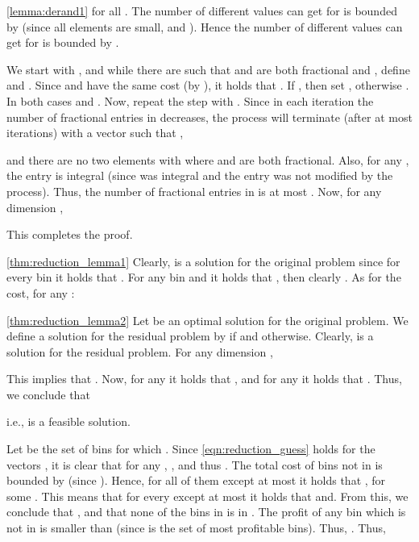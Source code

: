 \documentclass[11pt]{article}
\newenvironment{dl_proof}[1]{\noindent{\bf Proof of Lemma #1:}}{
 \hspace*{\fill}  \vskip \belowdisplayskip}
\begin{document}
{\begin{dl_proof}{\ref{lemma:derand1}}
for all .
The number of different values  can get for 
is bounded by  (since all elements are
small, and ). Hence the number of different
values  can get for  is bounded by
.

We start with , and while there are  such that  and  are both
fractional and , define 
and .
Since  and  have the same cost (by ), it holds that
.
If ,
then set , otherwise .
In both cases  and . Now, repeat
the step with .
Since in each iteration the number of fractional entries in  decreases,
 the process will terminate (after at most  iterations)
with a vector  such that ,

and there are no two elements  with  where
 and  are both fractional. Also, for any , the entry
 is integral (since  was integral and the entry was not modified by
the process). Thus, the number of fractional entries in  is
at most .
Now, for any dimension ,

This completes the proof.
\end{dl_proof}

\begin{dl_proof}{\ref{thm:reduction_lemma1}}
Clearly,  is a solution for the original problem since for every bin  it holds that .
For any bin  and  it holds that , then clearly .
As for the cost, for any :

\end{dl_proof}

\begin{dl_proof}{\ref{thm:reduction_lemma2}}
Let  be an optimal solution for the original problem. We define a
solution  for the residual problem by  if   and
 otherwise. Clearly,  is a solution for the residual problem.
For any dimension ,

This implies that .  Now, for any  it holds that , and
for any  it holds that . Thus, we conclude that

i.e.,  is a feasible solution.

Let  be the set of bins for which .
Since  \eqref{eqn:reduction_guess} holds for the vectors ,
it is clear that for any , , and thus .
The total cost of bins not in  is bounded by  (since ).
Hence, for all of them except at most  it holds that ,
for some .
This means that for every  except at most 
 it holds that  and.
From this, we conclude that , and that none of the bins in  is
in . The profit of any bin which is not in  is smaller
than  (since  is the set of most profitable bins).
Thus,
.
Thus,

\end{dl_proof}

}
\end{document}
